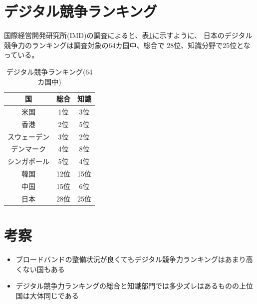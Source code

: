 \documentclass[a4paper,11pt,dvipdfmx]{ujarticle}
\begin{document}
\section{デジタル競争ランキング}

国際経営開発研究所(IMD)の調査\cite{imd}によると、表\ref{2}に示すように、
日本のデジタル競争力のランキングは調査対象の64カ国中、総合で
28位、知識分野で25位となっている。
\begin{table}[htbp]
    \centering
    \caption{デジタル競争ランキング(64カ国中)}
    \label{2}

    \begin{tabular}{c|c|c}
        国 & 総合 & 知識 \\
        \hline
        米国 & 1位 & 3位 \\
        \hline
        香港 & 2位 & 5位 \\
        \hline
        スウェーデン & 3位 & 2位 \\
        \hline
        デンマーク & 4位 & 8位 \\
        \hline
        シンガポール & 5位 & 4位 \\
        \hline
        韓国 & 12位 & 15位 \\
        \hline
        中国 & 15位 & 6位 \\
        \hline
        日本 & 28位 & 25位 \\
        \hline
    \end{tabular}
\end{table}


\section{考察}

\begin{itemize}
    \item ブロードバンドの整備状況が良くてもデジタル競争力ランキングはあまり高くない国もある
    \item デジタル競争力ランキングの総合と知識部門では多少ズレはあるものの上位国は大体同じである
\end{itemize}

%


\end{document}
